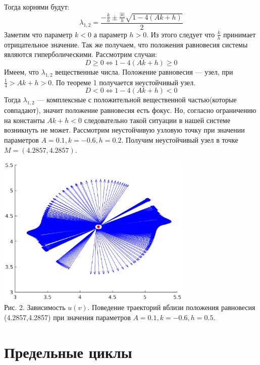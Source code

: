 \documentclass[11pt]{article}
\begin{document}
{	{Тогда корнями будут:}
	\begin{equation}
		\lambda_{1,2} = \frac{-\frac{k}{h} \pm \frac{|k|}{h}\sqrt{1 - 4(Ak + h)}}{2}
	\end{equation}
	{Заметим что параметр $k < 0$ а параметр $h > 0$. Из этого следует что $\frac{k}{h}$ принимает отрицательное значение. Так же получаем, что положения равновесия системы являются гиперболическими. Рассмотрим случаи:} 
	\begin{equation}
		D \geq 0 \Leftrightarrow 1 - 4(Ak + h) \geq 0
	\end{equation}
	{Имеем, что $\lambda_{1,2}$ вещественные числа. Положение равновесия --- узел, при $\frac{1}{4} > Ak+h > 0$. По теореме 1 получается неустойчивый узел.}
	\begin{equation}
	D < 0 \Leftrightarrow 1 - 4(Ak + h) < 0
	\end{equation}
	{Тогда $\lambda_{1,2}$ --- комплексные с положительной вещественной частью(которые совпадают), значит положение равновесия есть фокус. Но, согласно ограничению на константы $Ak + h < 0$ следовательно такой ситуации в нашей системе возникнуть не может.}
	\newline
	{Рассмотрим неустойчивую узловую точку при значении параметров $A = 0.1, k = -0.6, h = 0.2.$ Получим неустойчивый узел в точке $M = (4.2857,4.2857).$}
	\begin{center}
		\includegraphics[width=0.7\textwidth]{pic_2.eps}\\
		{Рис. 2. Зависимость $u(v).$ Поведение траекторий вблизи положения равновесия (4.2857,4.2857) при значения параметров $A = 0.1, k = -0.6, h = 0.5.$ }
	\end{center}
	\newpage
	{\section{Предельные циклы}}
}
\end{document}
